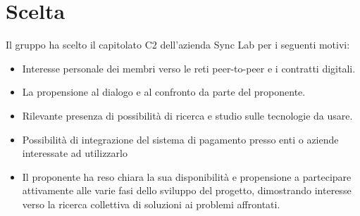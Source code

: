\documentclass[a4paper, 12pt]{article}
\begin{document}
\makefrontpage

\makeversioni

\section{Scelta}\label{scelta}
Il gruppo ha scelto il capitolato C2 dell’azienda Sync Lab per i seguenti motivi:
\begin{itemize}
\item Interesse personale dei membri verso le reti peer-to-peer e i contratti digitali. 
\item La propensione al dialogo e al confronto da parte del proponente.
\item Rilevante presenza di possibilità di ricerca e studio sulle tecnologie da usare.
\item Possibilità di integrazione del sistema di pagamento presso enti o aziende interessate ad utilizzarlo
\item Il proponente ha reso chiara la sua disponibilità e propensione a partecipare attivamente alle varie fasi dello sviluppo del progetto, dimostrando interesse verso la ricerca collettiva di soluzioni ai problemi affrontati.
\end{itemize}
\end{document}
